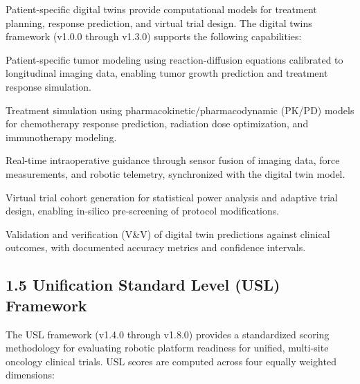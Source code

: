 \documentclass[11pt]{article}
\begin{document}
Patient-specific digital twins provide computational models for treatment planning, response prediction, and virtual trial design. The digital twins framework (v1.0.0 through v1.3.0) supports the following capabilities:

\begin{description}[leftmargin=2.5cm,style=sameline]

\item[(a)] Patient-specific tumor modeling using reaction-diffusion equations calibrated to longitudinal imaging data, enabling tumor growth prediction and treatment response simulation.

\item[(b)] Treatment simulation using pharmacokinetic/pharmacodynamic (PK/PD) models for chemotherapy response prediction, radiation dose optimization, and immunotherapy modeling.

\item[(c)] Real-time intraoperative guidance through sensor fusion of imaging data, force measurements, and robotic telemetry, synchronized with the digital twin model.

\item[(d)] Virtual trial cohort generation for statistical power analysis and adaptive trial design, enabling in-silico pre-screening of protocol modifications.

\item[(e)] Validation and verification (V\&V) of digital twin predictions against clinical outcomes, with documented accuracy metrics and confidence intervals.

\end{description}

\subsection{1.5 Unification Standard Level (USL) Framework}

The USL framework (v1.4.0 through v1.8.0) provides a standardized scoring methodology for evaluating robotic platform readiness for unified, multi-site oncology clinical trials. USL scores are computed across four equally weighted dimensions:
\end{document}
